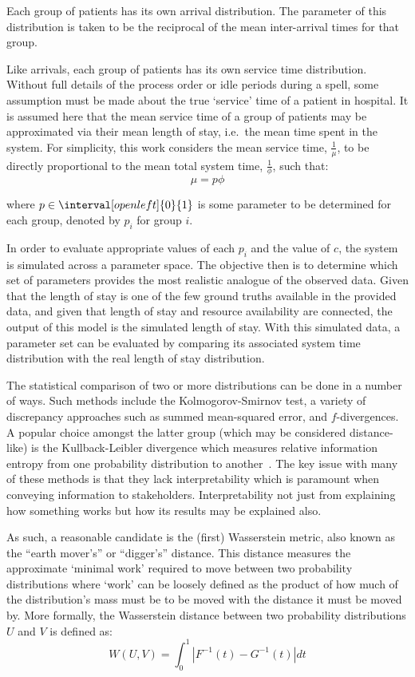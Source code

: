 Each group of patients has its own arrival distribution. The parameter of this
distribution is taken to be the reciprocal of the mean inter-arrival times for
that group.

Like arrivals, each group of patients has its own service time distribution.
Without full details of the process order or idle periods during a spell, some
assumption must be made about the true `service' time of a patient in hospital.
It is assumed here that the mean service time of a group of patients may be
approximated via their mean length of stay, i.e.\ the mean time spent in the
system. For simplicity, this work considers the mean service time,
\(\frac{1}{\mu}\), to be directly proportional to the mean total system time,
\(\frac{1}{\phi}\), such that:
\begin{equation}
    \mu = p \phi
\end{equation}

\noindent where \(p \in \interval[open left]{0}{1}\) is some parameter to be
determined for each group, denoted by \(p_i\) for group \(i\).

In order to evaluate appropriate values of each \(p_i\) and the value of \(c\),
the system is simulated across a parameter space. The objective then is to
determine which set of parameters provides the most realistic analogue of the
observed data. Given that the length of stay is one of the few ground truths
available in the provided data, and given that length of stay and resource
availability are connected, the output of this model is the simulated length of
stay. With this simulated data, a parameter set can be evaluated by comparing
its associated system time distribution with the real length of stay
distribution.

The statistical comparison of two or more distributions can be done in a number
of ways. Such methods include the Kolmogorov-Smirnov test, a variety of
discrepancy approaches such as summed mean-squared error, and \(f\)-divergences.
A popular choice amongst the latter group (which may be considered
distance-like) is the Kullback-Leibler divergence which measures relative
information entropy from one probability distribution to
another~\cite{Kullback1951}. The key issue with many of these methods is that
they lack interpretability which is paramount when conveying information to
stakeholders. Interpretability not just from explaining how something works but
how its results may be explained also.

As such, a reasonable candidate is the (first) Wasserstein metric, also known as
the ``earth mover's'' or ``digger's'' distance.  This distance measures the
approximate `minimal work' required to move between two probability
distributions where `work' can be loosely defined as the product of how much of
the distribution's mass must be to be moved with the distance it must be moved
by. More formally, the Wasserstein distance between two probability
distributions \(U\) and \(V\) is defined as:
\begin{equation}\label{eq:wasserstein}
    W(U, V) = \int_{0}^{1} \left\vert F^{-1}(t) - G^{-1}(t) \right\vert dt
\end{equation}

